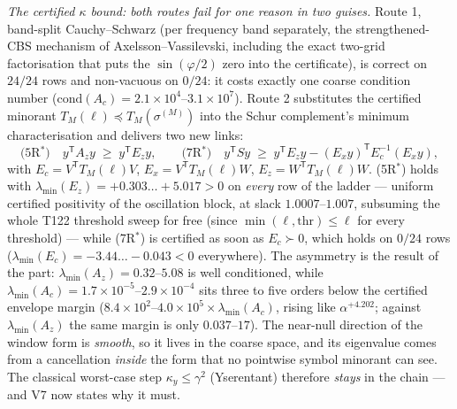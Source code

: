 \documentclass[11pt,a4paper]{article}
\begin{document}
\emph{The certified $\kappa$ bound: both routes fail for one reason in two guises.} Route 1,
band-split Cauchy--Schwarz (per frequency band separately, the strengthened-CBS mechanism of
Axelsson--Vassilevski, including the exact two-grid factorisation that puts the
$\sin(\varphi/2)$ zero into the certificate), is correct on $24/24$ rows and non-vacuous on
$0/24$: it costs exactly one coarse condition number
($\mathrm{cond}(A_c)=2.1\times10^{4}$--$3.1\times10^{7}$). Route 2 substitutes the certified
minorant $T_M(\ell)\preceq T_M(\sigma^{(M)})$ into the Schur complement's minimum
characterisation and delivers two new links:
\[
\text{(5R$^*$)}\quad y^{\mathsf T}A_zy\;\ge\;y^{\mathsf T}E_zy,
\qquad
\text{(7R$^*$)}\quad y^{\mathsf T}Sy\;\ge\;y^{\mathsf T}E_zy-(E_xy)^{\mathsf T}E_c^{-1}(E_xy),
\]
with $E_c=V^{\mathsf T}T_M(\ell)V$, $E_x=V^{\mathsf T}T_M(\ell)W$,
$E_z=W^{\mathsf T}T_M(\ell)W$. (5R$^*$) holds with
$\lambda_{\min}(E_z)=+0.303\ldots+5.017>0$ on \emph{every} row of the ladder --- uniform
certified positivity of the oscillation block, at slack $1.0007$--$1.007$, subsuming the
whole T122 threshold sweep for free (since $\min(\ell,\mathrm{thr})\le\ell$ for every
threshold) --- while (7R$^*$) is certified as soon as $E_c\succ0$, which holds on $0/24$
rows ($\lambda_{\min}(E_c)=-3.44\ldots-0.043<0$ everywhere). The asymmetry is the result of
the part: $\lambda_{\min}(A_z)=0.32$--$5.08$ is well conditioned, while
$\lambda_{\min}(A_c)=1.7\times10^{-5}$--$2.9\times10^{-4}$ sits three to five orders below
the certified envelope margin ($8.4\times10^{2}$--$4.0\times10^{5}\times\lambda_{\min}(A_c)$,
rising like $\alpha^{+4.202}$; against $\lambda_{\min}(A_z)$ the same margin is only
$0.037$--$17$). The near-null direction of the window form is \emph{smooth}, so it lives in
the coarse space, and its eigenvalue comes from a cancellation \emph{inside} the form that no
pointwise symbol minorant can see. The classical worst-case step $\kappa_y\le\gamma^2$
(Yserentant) therefore \emph{stays} in the chain --- and V7 now states why it must.
\end{document}
